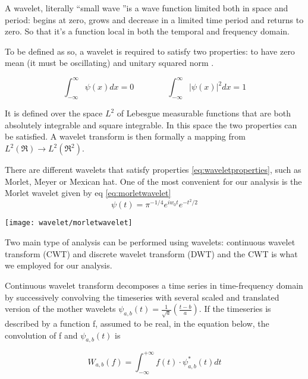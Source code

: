 \documentclass[a4paper,11pt]{article}
\begin{document}
A wavelet, literally \textquotedblleft small wave \textquotedblright is a wave function limited both in space and period: begins at zero, grows and decrease in a limited time period and returns to zero. So that it's a function local in both the temporal and frequency domain.

To be defined as so, a wavelet is required to satisfy two properties: to have zero mean (it must be oscillating) and unitary squared norm \cite{percival2013}.

\begin{equation}\label{eq:waveletproperties}
\int_{-\infty}^{\infty}\psi(x)dx = 0 \qquad \qquad  \int_{-\infty}^{\infty} |\psi(x)|^2 dx = 1
\end{equation}

It is defined over the space $L^2$ of Lebesgue measurable functions that are both absolutely integrable and square integrable. In this space the two properties can be satisfied. A wavelet transform is then formally a mapping from $L^2(\Re) \rightarrow L^2(\Re^2)$.


There are different wavelets that satisfy properties \ref{eq:waveletproperties}, such as Morlet, Meyer or Mexican hat.
One of the most convenient for our analysis is the Morlet wavelet given by eq \ref{eq:morletwavelet}
\begin{equation}\label{eq:morletwavelet}
\psi\left(t\right) = \pi^{-1/4}e^{iw_0 t}e^{-t^2/2}
\end{equation}

\texttt{[image: wavelet/morletwavelet]}


Two main type of analysis can be performed using wavelets: continuous wavelet transform (CWT) and discrete wavelet transform (DWT) and the CWT is what we employed for our analysis.

Continuous wavelet transform decomposes a time series in time-frequency domain by successively convolving the timeseries with several scaled and translated version of the mother wavelets $\psi_{a, b}\left(t\right) = \frac{1}{\sqrt{a}}\left(\frac{t-b}{a}\right)$.
If the timeseries is described by a function f, assumed to be real, in the equation below, the convolution of f and $\psi_{a, b}\left(t\right)$ is

\begin{equation}
W_{a,b}(f) = \int_{-\infty}^{+\infty}  f(t) \cdot \psi_{a, b}^\ast \left(t\right)   dt
\end{equation}
\end{document}
